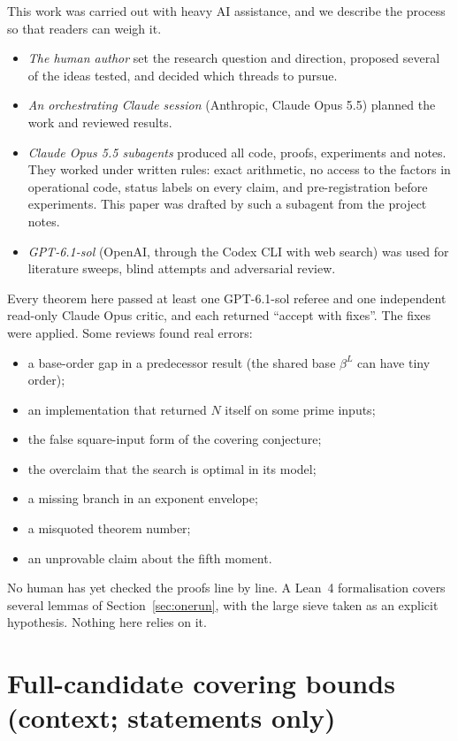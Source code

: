 \documentclass[11pt]{amsart}
\theoremstyle{definition}
\begin{document}
This work was carried out with heavy AI assistance, and we describe the process so that readers
can weigh it.
\begin{itemize}
\item \emph{The human author} set the research question and direction, proposed several of the
  ideas tested, and decided which threads to pursue.
\item \emph{An orchestrating Claude session} (Anthropic, Claude Opus 5.5) planned the work and
  reviewed results.
\item \emph{Claude Opus 5.5 subagents} produced all code, proofs, experiments and notes. They
  worked under written rules: exact arithmetic, no access to the factors in operational code,
  status labels on every claim, and pre-registration before experiments. This paper was drafted
  by such a subagent from the project notes.
\item \emph{GPT-6.1-sol} (OpenAI, through the Codex CLI with web search) was used for literature
  sweeps, blind attempts and adversarial review.
\end{itemize}

Every theorem here passed at least one GPT-6.1-sol referee and one independent read-only Claude
Opus critic, and each returned ``accept with fixes''. The fixes were applied. Some reviews found
real errors:
\begin{itemize}
\item a base-order gap in a predecessor result (the shared base $\beta^L$ can have tiny order);
\item an implementation that returned $N$ itself on some prime inputs;
\item the false square-input form of the covering conjecture;
\item the overclaim that the search is optimal in its model;
\item a missing branch in an exponent envelope;
\item a misquoted theorem number;
\item an unprovable claim about the fifth moment.
\end{itemize}
No human has yet checked the proofs line by line. A Lean~4 formalisation covers several lemmas
of Section~\ref{sec:onerun}, with the large sieve taken as an explicit hypothesis. Nothing here
relies on it.

\appendix
\section{Full-candidate covering bounds (context; statements only)}\label{app:full}
\end{document}
